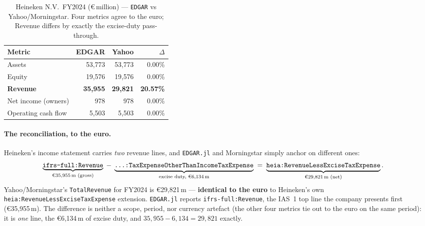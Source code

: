 \documentclass[11pt,a4paper]{report}
\begin{document}
\begin{table}[h]
\centering
\caption{Heineken N.V.\ FY2024 (€\,million) --- \texttt{EDGAR} vs Yahoo/Morningstar. Four metrics agree to
the euro; Revenue differs by exactly the excise-duty pass-through.}
\label{tab:heineken-yahoo}
\small
\begin{tabular}{@{}lrrr@{}}
\toprule
\textbf{Metric} & \textbf{EDGAR} & \textbf{Yahoo} & \textbf{$\Delta$} \\
\midrule
Assets              & 53{,}773 & 53{,}773 & 0.00\% \\
Equity              & 19{,}576 & 19{,}576 & 0.00\% \\
\textbf{Revenue}    & \textbf{35{,}955} & \textbf{29{,}821} & \textbf{20.57\%} \\
Net income (owners) &    978 &    978 & 0.00\% \\
Operating cash flow &  5{,}503 &  5{,}503 & 0.00\% \\
\bottomrule
\end{tabular}
\end{table}

\paragraph{The reconciliation, to the euro.} Heineken's income statement carries \emph{two} revenue lines, and
\texttt{EDGAR.jl} and Morningstar simply anchor on different ones:
\[
\underbrace{\texttt{ifrs-full:Revenue}}_{\text{€35{,}955\,m (gross)}}
\;-\;
\underbrace{\texttt{…:TaxExpenseOtherThanIncomeTaxExpense}}_{\text{excise duty, €6{,}134\,m}}
\;=\;
\underbrace{\texttt{heia:RevenueLessExciseTaxExpense}}_{\text{€29{,}821\,m (net)}}.
\]
Yahoo/Morningstar's \texttt{TotalRevenue} for FY2024 is €29{,}821\,m --- \textbf{identical to the euro} to
Heineken's own \texttt{heia:RevenueLessExciseTaxExpense} extension. \texttt{EDGAR.jl} reports
\texttt{ifrs-full:Revenue}, the IAS~1 top line the company presents first (€35{,}955\,m). The difference is
neither a scope, period, nor currency artefact (the other four metrics tie out to the euro on the same period):
it is \emph{one} line, the €6{,}134\,m of excise duty, and \(35{,}955 - 6{,}134 = 29{,}821\) exactly.
\end{document}

